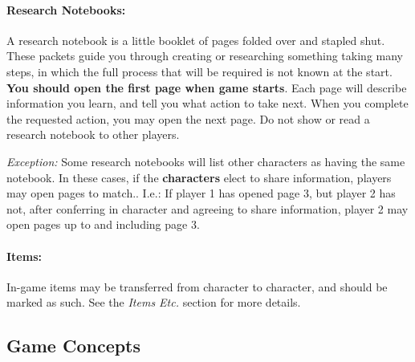 \documentclass[sheet]{GL2020}
\begin{document}
\paragraph{Research Notebooks:} A research notebook is a little booklet of pages folded over and stapled shut. These packets guide you through creating or researching something taking many steps, in which the full process that will be required is not known at the start. \textbf{You should open the first page when game starts}. Each page will describe information you learn, and tell you what action to take next. When you complete the requested action, you may open the next page. Do not show or read a research notebook to other players. 

\emph{Exception:} Some research notebooks will list other characters as having the same notebook. In these cases, if the \textbf{characters} elect to share information, players may open pages to match.. I.e.: If player 1 has opened page 3, but player 2 has not, after conferring in character and agreeing to share information, player 2 may open pages up to and including page 3.

\paragraph{Items:} In-game items may be transferred from character to character, and should be marked as such.  See the \emph{Items Etc.} section for more details.


\subsection{Game Concepts}

\end{document}
